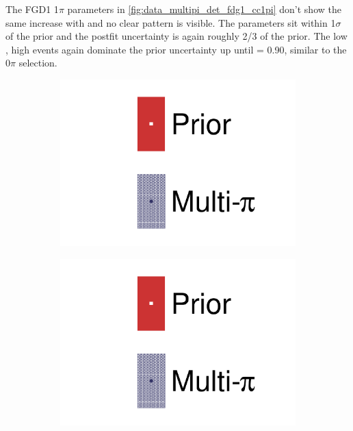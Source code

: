 The FGD1 1$\pi$ parameters in \autoref{fig:data_multipi_det_fdg1_cc1pi} don't show the same increase with \pmu and no clear pattern is visible. The parameters sit within 1$\sigma$ of the prior and the postfit uncertainty is again roughly 2/3 of the prior. The low \cosmu, high \pmu events again dominate the prior uncertainty up until \cosmu= 0.90, similar to the 0$\pi$ selection.
\begin{figure}[h]
	\centering
	\begin{subfigure}[t]{0.1\textwidth}
		\includegraphics[width=\textwidth,page=1, trim={0mm 120mm 40mm 20mm}, clip]{figures/mach3/2018/data/2018a_FixedCov_RedCov_Mpi_Data_merge_drawPar_withDet}
	\end{subfigure}
	\begin{subfigure}[t]{0.1\textwidth}
		\includegraphics[width=\textwidth,page=1, trim={0mm 20mm 40mm 120mm}, clip]{figures/mach3/2018/data/2018a_FixedCov_RedCov_Mpi_Data_merge_drawPar_withDet}
	\end{subfigure}


\end{figure}
